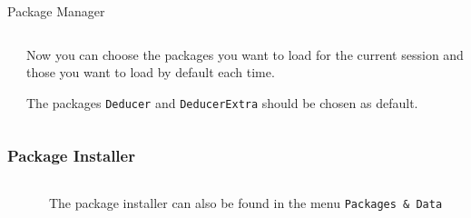 \documentclass[xcolor={table},c]{beamer}
\begin{document}
\begin{frame}[shrink=5]{Package Manager}
    \vspace*{0.5cm}
\begin{columns}[c]
  \begin{column}{0.5\textwidth}
  \end{column}
  \begin{column}{0.5\textwidth}Now you can choose the packages you want to load for the current session and those you want to load by default each time. 

The packages \texttt{Deducer} and \texttt{DeducerExtra} should be chosen as default.
  \end{column}
 \end{columns}
\end{frame}

\begin{frame}\frametitle{Package Installer}
  \begin{columns}
    \begin{column}{0.3\textwidth}
    \end{column}
    \begin{column}{0.7\textwidth}
      The package installer can also be found in the menu \texttt{Packages \& Data}
    \end{column}
  \end{columns}
\end{frame}
\end{document}
